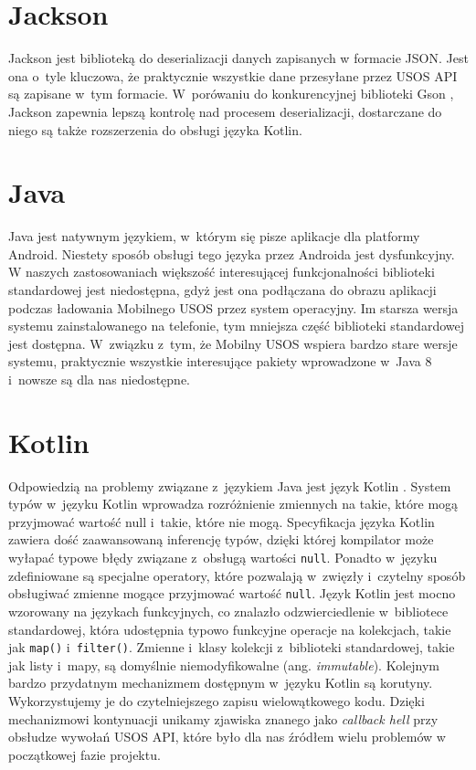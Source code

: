 \documentclass{pracamgr}
\begin{document}
\section{Jackson}

Jackson \cite{jackson} jest biblioteką do deserializacji danych zapisanych w
formacie JSON. Jest ona o~tyle kluczowa, że praktycznie wszystkie dane przesyłane
przez USOS API są zapisane w~tym formacie. W~porówaniu do konkurencyjnej biblioteki
Gson \cite{gson}, Jackson zapewnia lepszą kontrolę nad procesem deserializacji,
dostarczane do niego są także rozszerzenia do obsługi języka Kotlin.

\section{Java}

Java \cite{java} jest natywnym językiem, w~którym się pisze aplikacje dla platformy
Android. Niestety sposób obsługi tego języka przez Androida jest dysfunkcyjny.
W naszych zastosowaniach większość interesującej funkcjonalności biblioteki
standardowej jest niedostępna, gdyż jest ona podłączana do obrazu aplikacji podczas
ładowania Mobilnego USOS przez system operacyjny. Im starsza wersja systemu
zainstalowanego na telefonie, tym mniejsza część biblioteki standardowej jest
dostępna. W~związku z~tym, że Mobilny USOS wspiera bardzo stare wersje systemu,
praktycznie wszystkie interesujące pakiety wprowadzone w~Java 8 i~nowsze są dla
nas niedostępne.

\section{Kotlin}

Odpowiedzią na problemy związane z~językiem Java jest język Kotlin \cite{kotlin}.
System typów w~języku Kotlin wprowadza rozróżnienie zmiennych na takie, które mogą
przyjmować wartość null i~takie, które nie mogą. Specyfikacja języka Kotlin zawiera
dość zaawansowaną inferencję typów, dzięki której kompilator może wyłapać typowe błędy
związane z~obsługą wartości \texttt{null}. Ponadto w~języku zdefiniowane są specjalne
operatory, które pozwalają w~zwięzły i~czytelny sposób obsługiwać zmienne mogące
przyjmować wartość \texttt{null}. Język Kotlin jest mocno wzorowany na językach funkcyjnych,
co znalazło odzwierciedlenie w~bibliotece standardowej, która udostępnia typowo
funkcyjne operacje na kolekcjach, takie jak \texttt{map()} i~\texttt{filter()}. Zmienne i~klasy
kolekcji z~biblioteki standardowej, takie jak listy i~mapy, są domyślnie niemodyfikowalne
(ang. \textit{immutable}). Kolejnym bardzo przydatnym mechanizmem dostępnym w~języku
Kotlin są korutyny. Wykorzystujemy je do czytelniejszego zapisu wielowątkowego
kodu. Dzięki mechanizmowi kontynuacji unikamy zjawiska znanego jako \textit{callback hell}
przy obsłudze wywołań USOS API, które było dla nas źródłem wielu problemów w
początkowej fazie projektu.
\end{document}

